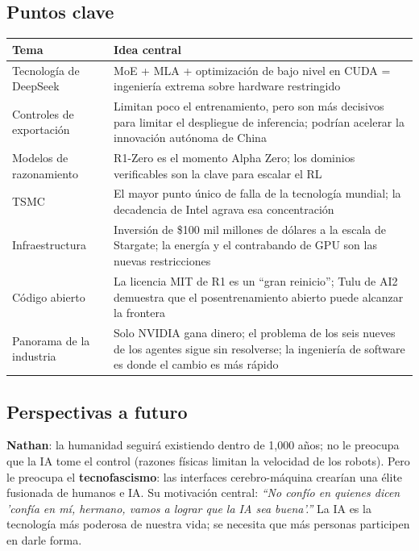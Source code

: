 \documentclass[a4paper]{article}
\begin{document}
\subsection{Puntos clave}

\begin{table}[H]
\centering
\begin{tabular}{lp{9cm}}
\toprule
\textbf{Tema} & \textbf{Idea central} \\
\midrule
Tecnología de DeepSeek & MoE + MLA + optimización de bajo nivel en CUDA = ingeniería extrema sobre hardware restringido \\
Controles de exportación & Limitan poco el entrenamiento, pero son más decisivos para limitar el despliegue de inferencia; podrían acelerar la innovación autónoma de China \\
Modelos de razonamiento & R1-Zero es el momento Alpha Zero; los dominios verificables son la clave para escalar el RL \\
TSMC & El mayor punto único de falla de la tecnología mundial; la decadencia de Intel agrava esa concentración \\
Infraestructura & Inversión de \$100 mil millones de dólares a la escala de Stargate; la energía y el contrabando de GPU son las nuevas restricciones \\
Código abierto & La licencia MIT de R1 es un ``gran reinicio''; Tulu de AI2 demuestra que el posentrenamiento abierto puede alcanzar la frontera \\
Panorama de la industria & Solo NVIDIA gana dinero; el problema de los seis nueves de los agentes sigue sin resolverse; la ingeniería de software es donde el cambio es más rápido \\
\bottomrule
\end{tabular}
\end{table}

\subsection{Perspectivas a futuro}

\textbf{Nathan}: la humanidad seguirá existiendo dentro de 1,000 años; no le preocupa que la IA tome el control (razones físicas limitan la velocidad de los robots). Pero le preocupa el \textbf{tecnofascismo}: las interfaces cerebro-máquina crearían una élite fusionada de humanos e IA. Su motivación central: \textit{``No confío en quienes dicen 'confía en mí, hermano, vamos a lograr que la IA sea buena'.''} La IA es la tecnología más poderosa de nuestra vida; se necesita que más personas participen en darle forma.
\end{document}
